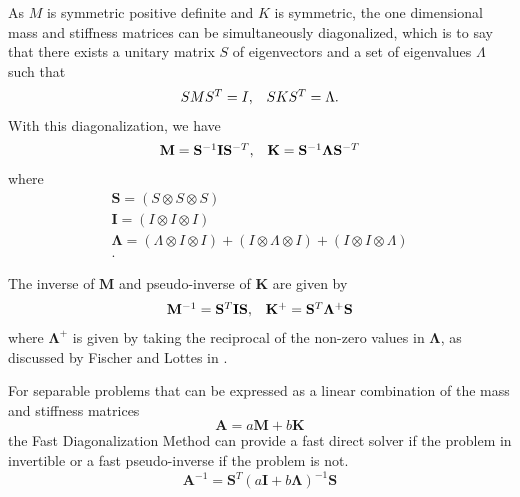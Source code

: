 As $M$ is symmetric positive definite and $K$ is symmetric, the one dimensional mass and stiffness matrices can be simultaneously diagonalized, which is to say that there exists a unitary matrix $S$ of eigenvectors and a set of eigenvalues $\Lambda$ such that
\begin{equation}
\begin{array}{c c}
S M S^T = I,  &  S K S^T = \Lambda.
\end{array}
\end{equation}
With this diagonalization, we have
\begin{equation}
\begin{array}{c c}
\mathbf{M}   = \mathbf{S}^{-1} \mathbf{I} \mathbf{S}^{-T},  &  \mathbf{K} = \mathbf{S}^{-1} \mathbf{\Lambda} \mathbf{S}^{-T}  \\
\end{array}
\end{equation}
where
\begin{equation}
\begin{array}{c}
\mathbf{S}       = \left( S \otimes S \otimes S \right)  \\
\mathbf{I}       = \left( I \otimes I \otimes I \right)  \\
\mathbf{\Lambda} = \left( \Lambda \otimes I \otimes I \right) + \left( I \otimes \Lambda \otimes I \right) + \left( I \otimes I \otimes \Lambda \right)  \\.
\end{array}
\end{equation}

The inverse of $\mathbf{M}$ and pseudo-inverse of $\mathbf{K}$ are given by
\begin{equation}
\begin{array}{c c}
\mathbf{M}^{-1} = \mathbf{S}^T \mathbf{I} \mathbf{S},  &  \mathbf{K}^{+} = \mathbf{S}^T \mathbf{\Lambda}^{+} \mathbf{S}
\end{array}
\end{equation}
where $\mathbf{\Lambda}^{+}$ is given by taking the reciprocal of the non-zero values in $\mathbf{\Lambda}$, as discussed by Fischer and Lottes in \cite{fischer2005hybrid}.

For separable problems that can be expressed as a linear combination of the mass and stiffness matrices
\begin{equation}
\mathbf{A} = a \mathbf{M} + b \mathbf{K}
\end{equation}
the Fast Diagonalization Method can provide a fast direct solver if the problem in invertible or a fast pseudo-inverse if the problem is not.
\begin{equation}
\mathbf{A}^{-1} = \mathbf{S}^T \left( a \mathbf{I} + b \mathbf{\Lambda} \right)^{-1} \mathbf{S}
\label{eq:fdminverse}
\end{equation}

